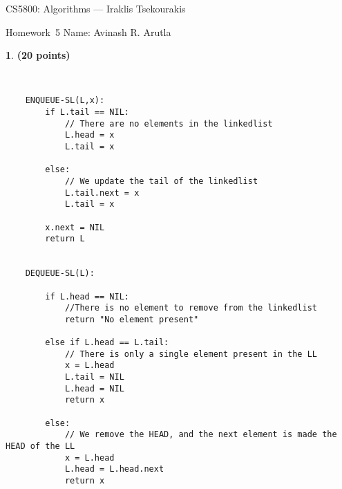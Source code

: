 \documentclass[11pt]{article}
\newcommand{\yourname}{Avinash R. Arutla}
\theoremstyle{definition}
\newcommand{\instructor}{Iraklis Tsekourakis}
\newcommand{\hwnum}{5}
\newtheorem{prob}{}
\newcommand{\solution}{\medskip\noindent{\color{DarkBlue}\textbf{Solution:}}}
\begin{document}
{\Large
\begin{center}{CS5800: Algorithms} --- \instructor \end{center}}
{\large
\vspace{10pt}
\noindent Homework~\hwnum \vspace{2pt}%
}
\bigskip
{\large \noindent Name: \yourname }
\vspace{15pt}





\begin{prob} \textbf{(20 points)}
\end{prob}

\solution \\ 

\begin{verbatim}
    ENQUEUE-SL(L,x):
        if L.tail == NIL:
            // There are no elements in the linkedlist
            L.head = x
            L.tail = x
        
        else:
            // We update the tail of the linkedlist
            L.tail.next = x
            L.tail = x
        
        x.next = NIL
        return L
    

    DEQUEUE-SL(L):

        if L.head == NIL:
            //There is no element to remove from the linkedlist
            return "No element present"
        
        else if L.head == L.tail:
            // There is only a single element present in the LL
            x = L.head
            L.tail = NIL
            L.head = NIL
            return x
        
        else:
            // We remove the HEAD, and the next element is made the HEAD of the LL
            x = L.head
            L.head = L.head.next
            return x
\end{verbatim}
\end{document}
